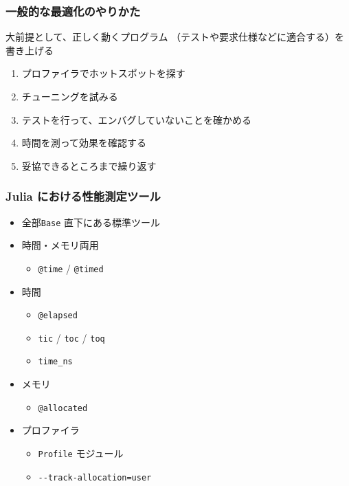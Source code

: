 \begin{frame}
  \frametitle{一般的な最適化のやりかた}
    大前提として、正しく動くプログラム
      （テストや要求仕様などに適合する）を書き上げる
  \begin{enumerate}
    \item プロファイラでホットスポットを探す
    \item チューニングを試みる
    \item テストを行って、エンバグしていないことを確かめる
    \item 時間を測って効果を確認する
    \item 妥協できるところまで繰り返す
  \end{enumerate}
\end{frame}

\begin{frame}[containsverbatim]
\frametitle{Julia における性能測定ツール}
\begin{itemize}
  \item 全部\verb|Base| 直下にある標準ツール
  \item 時間・メモリ両用
    \begin{itemize}
      \item \verb|@time| / \verb|@timed|
    \end{itemize}
  \item 時間
    \begin{itemize}
      \item \verb|@elapsed|
      \item \verb|tic| / \verb|toc| / \verb|toq|
      \item \verb|time_ns|
    \end{itemize}
  \item メモリ
    \begin{itemize}
      \item \verb|@allocated|
    \end{itemize}
  \item プロファイラ
    \begin{itemize}
      \item \verb|Profile| モジュール
      \item \verb|--track-allocation=user|
    \end{itemize}
\end{itemize}
\end{frame}

